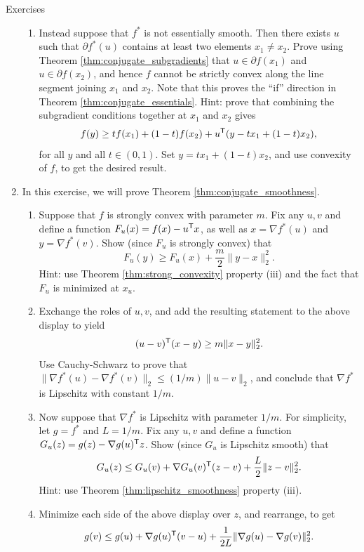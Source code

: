 \begin{xcb}{Exercises}
\begin{enumerate}[label=\thechapter.\arabic*]
\begin{enumerate}[label=\alph*.]
\item Instead suppose that $f^*$ is not essentially smooth. Then there exists
  $u$ such that $\partial f^*(u)$ contains at least two elements $x_1 \not= 
  x_2$. Prove using Theorem \ref{thm:conjugate_subgradients} that $u \in
  \partial f(x_1)$ and $u \in \partial f(x_2)$, and hence $f$ cannot be strictly
  convex along the line segment joining $x_1$ and $x_2$. Note that this proves
  the ``if'' direction in Theorem \ref{thm:conjugate_essentials}. Hint: prove
  that combining the subgradient conditions together at $x_1$ and $x_2$ gives  
  \[
  f(y) \geq tf(x_1) + (1-t)f(x_2) + u^{\mathsf{T}} (y - tx_1 + (1-t)x_2),
  \]
  for all $y$ and all $t \in (0,1)$. Set $y = tx_1 + (1-t)x_2$, and use
  convexity of $f$, to get the desired result. 
\end{enumerate}

\item \label{ex:conjugate_smoothness}
  In this exercise, we will prove Theorem \ref{thm:conjugate_smoothness}.

\begin{enumerate}[label=\alph*.]
\item Suppose that $f$ is strongly convex with parameter $m$. Fix any $u,v$ and
  define a function $F_u(x) = f(x) - u^{\mathsf{T}} x$, as well as $x = \nabla f^*(u)$ and
  $y = \nabla f^*(v)$. Show (since $F_u$ is strongly convex) that 
  \[
  F_u(y) \geq F_u(x) + \frac{m}{2} \|y-x\|_2^2.
  \]
  Hint:  use Theorem \ref{thm:strong_convexity} property (iii) and the fact that
  $F_u$ is minimized at $x_u$. 

\item Exchange the roles of $u,v$, and add the resulting statement to the above
  display to yield 
  \[
  (u-v)^{\mathsf{T}} (x-y) \geq m \|x-y\|_2^2.
  \]
  Use Cauchy-Schwarz to prove that $\|\nabla f^*(u) - \nabla f^*(v)\|_2 \leq
  (1/m) \|u-v\|_2$, and conclude that $\nabla f^*$ is Lipschitz with constant
  $1/m$.    

\item Now suppose that $\nabla f^*$ is Lipschitz with parameter $1/m$. For
  simplicity, let $g=f^*$ and $L=1/m$. Fix any $u,v$ and define a function
  $G_u(z) = g(z) - \nabla g(u)^{\mathsf{T}} z$. Show (since $G_u$ is Lipschitz smooth) 
  that  
  \[
  G_u(z) \leq G_u(v) + \nabla G_u(v)^{\mathsf{T}} (z-v) + \frac{L}{2}\|z-v\|_2^2. 
  \]
  Hint: use Theorem \ref{thm:lipschitz_smoothness} property (iii).

\item Minimize each side of the above display over $z$, and rearrange, to get  
  \[
  g(v) \leq g(u) + \nabla g(u)^{\mathsf{T}} (v-u) + \frac{1}{2L}\|\nabla g(u) - \nabla 
  g(v)\|_2^2. 
  \]


\end{enumerate}
\end{enumerate}
\end{xcb}
